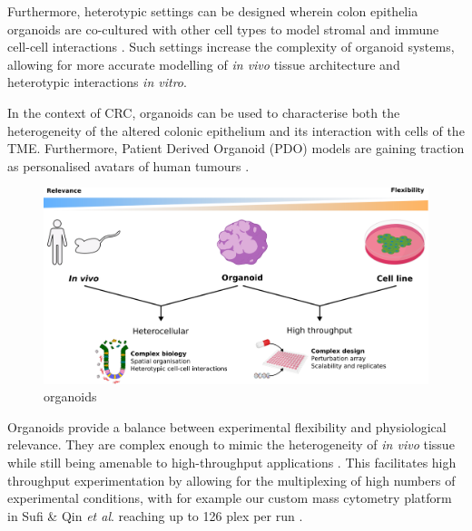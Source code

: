 Furthermore, heterotypic settings can be designed wherein colon epithelia organoids are co-cultured with other cell types to model stromal and immune cell-cell interactions \cite{qin_cell-type-specific_2020}. Such settings increase the complexity of organoid systems, allowing for more accurate modelling of \emph{in vivo} tissue architecture and heterotypic interactions \emph{in vitro}. 

In the context of CRC, organoids can be used to characterise both the heterogeneity of the altered colonic epithelium and its interaction with cells of the TME. Furthermore, Patient Derived Organoid (PDO) models are gaining traction as personalised avatars of human tumours \cite{su_efficacy_2023,zapatero_trellis_2023}.

\begin{figure}
    \centering
    \includegraphics{01intro/figs/1BIO_organoids.png}
    \caption{organoids}
    \label{fig:1org}
\end{figure}


Organoids provide a balance between experimental flexibility and physiological relevance. They are complex enough to mimic the heterogeneity of \emph{in vivo} tissue while still being amenable to high-throughput applications \cite{qin_deciphering_2020}. This facilitates high throughput experimentation by allowing for the multiplexing of high numbers of experimental conditions, with for example our custom mass cytometry platform in Sufi \& Qin \textit{et al}. reaching up to 126 plex per run \cite{sufi_multiplexed_2021}.

